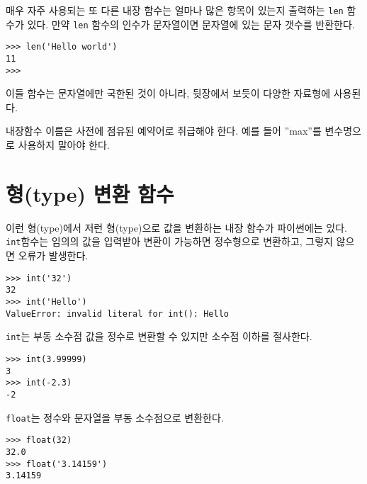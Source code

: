 매우 자주 사용되는 또 다른 내장 함수는 얼마나 많은 항목이 있는지 출력하는 {\tt len} 함수가 있다.
만약 {\tt len} 함수의 인수가 문자열이면 문자열에 있는 문자 갯수를 반환한다.

\beforeverb
\begin{verbatim}
>>> len('Hello world')
11
>>>
\end{verbatim}
\afterverb
%

이들 함수는 문자열에만 국한된 것이 아니라, 뒷장에서 보듯이 다양한 자료형에 사용된다.

내장함수 이름은 사전에 점유된 예약어로 취급해야 한다. 예를 들어 ''max''를 변수명으로 사용하지 말아야 한다.


\section{형(type) 변환 함수}



이런 형(type)에서 저런 형(type)으로 값을 변환하는 내장 함수가 파이썬에는 있다.
{\tt int}함수는 임의의 값을 입력받아 변환이 가능하면 정수형으로 변환하고, 그렇지 않으면 오류가 발생한다.


\beforeverb
\begin{verbatim}
>>> int('32')
32
>>> int('Hello')
ValueError: invalid literal for int(): Hello
\end{verbatim}
\afterverb
%

{\tt int}는 부동 소수점 값을 정수로 변환할 수 있지만 소수점 이하를 절사한다.

\beforeverb
\begin{verbatim}
>>> int(3.99999)
3
>>> int(-2.3)
-2
\end{verbatim}
\afterverb
%

{\tt float}는 정수와 문자열을 부동 소수점으로 변환한다.


\beforeverb
\begin{verbatim}
>>> float(32)
32.0
>>> float('3.14159')
3.14159
\end{verbatim}
\afterverb
%

